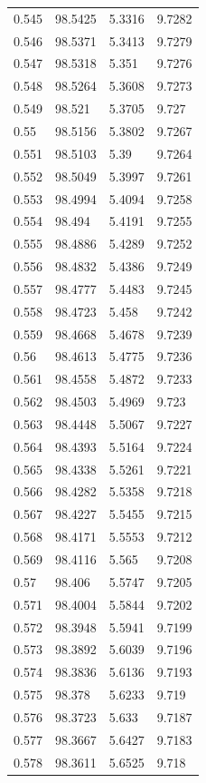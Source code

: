 \begin{tabular}{llll}
0.545 & 98.5425 & 5.3316 & 9.7282 \\
0.546 & 98.5371 & 5.3413 & 9.7279 \\
0.547 & 98.5318 & 5.351 & 9.7276 \\
0.548 & 98.5264 & 5.3608 & 9.7273 \\
0.549 & 98.521 & 5.3705 & 9.727 \\
0.55 & 98.5156 & 5.3802 & 9.7267 \\
0.551 & 98.5103 & 5.39 & 9.7264 \\
0.552 & 98.5049 & 5.3997 & 9.7261 \\
0.553 & 98.4994 & 5.4094 & 9.7258 \\
0.554 & 98.494 & 5.4191 & 9.7255 \\
0.555 & 98.4886 & 5.4289 & 9.7252 \\
0.556 & 98.4832 & 5.4386 & 9.7249 \\
0.557 & 98.4777 & 5.4483 & 9.7245 \\
0.558 & 98.4723 & 5.458 & 9.7242 \\
0.559 & 98.4668 & 5.4678 & 9.7239 \\
0.56 & 98.4613 & 5.4775 & 9.7236 \\
0.561 & 98.4558 & 5.4872 & 9.7233 \\
0.562 & 98.4503 & 5.4969 & 9.723 \\
0.563 & 98.4448 & 5.5067 & 9.7227 \\
0.564 & 98.4393 & 5.5164 & 9.7224 \\
0.565 & 98.4338 & 5.5261 & 9.7221 \\
0.566 & 98.4282 & 5.5358 & 9.7218 \\
0.567 & 98.4227 & 5.5455 & 9.7215 \\
0.568 & 98.4171 & 5.5553 & 9.7212 \\
0.569 & 98.4116 & 5.565 & 9.7208 \\
0.57 & 98.406 & 5.5747 & 9.7205 \\
0.571 & 98.4004 & 5.5844 & 9.7202 \\
0.572 & 98.3948 & 5.5941 & 9.7199 \\
0.573 & 98.3892 & 5.6039 & 9.7196 \\
0.574 & 98.3836 & 5.6136 & 9.7193 \\
0.575 & 98.378 & 5.6233 & 9.719 \\
0.576 & 98.3723 & 5.633 & 9.7187 \\
0.577 & 98.3667 & 5.6427 & 9.7183 \\
0.578 & 98.3611 & 5.6525 & 9.718 \\

\end{tabular}
